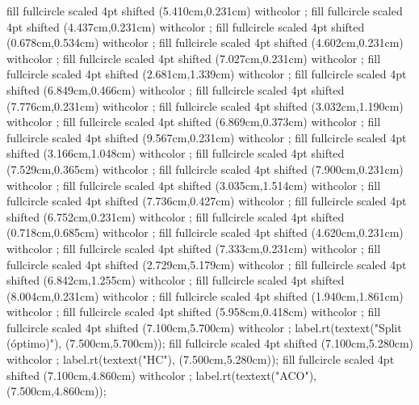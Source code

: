{fill fullcircle scaled 4pt shifted (5.410cm,0.231cm) withcolor ;
fill fullcircle scaled 4pt shifted (4.437cm,0.231cm) withcolor ;
fill fullcircle scaled 4pt shifted (0.678cm,0.534cm) withcolor ;
fill fullcircle scaled 4pt shifted (4.602cm,0.231cm) withcolor ;
fill fullcircle scaled 4pt shifted (7.027cm,0.231cm) withcolor ;
fill fullcircle scaled 4pt shifted (2.681cm,1.339cm) withcolor ;
fill fullcircle scaled 4pt shifted (6.849cm,0.466cm) withcolor ;
fill fullcircle scaled 4pt shifted (7.776cm,0.231cm) withcolor ;
fill fullcircle scaled 4pt shifted (3.032cm,1.190cm) withcolor ;
fill fullcircle scaled 4pt shifted (6.869cm,0.373cm) withcolor ;
fill fullcircle scaled 4pt shifted (9.567cm,0.231cm) withcolor ;
fill fullcircle scaled 4pt shifted (3.166cm,1.048cm) withcolor ;
fill fullcircle scaled 4pt shifted (7.529cm,0.365cm) withcolor ;
fill fullcircle scaled 4pt shifted (7.900cm,0.231cm) withcolor ;
fill fullcircle scaled 4pt shifted (3.035cm,1.514cm) withcolor ;
fill fullcircle scaled 4pt shifted (7.736cm,0.427cm) withcolor ;
fill fullcircle scaled 4pt shifted (6.752cm,0.231cm) withcolor ;
fill fullcircle scaled 4pt shifted (0.718cm,0.685cm) withcolor ;
fill fullcircle scaled 4pt shifted (4.620cm,0.231cm) withcolor ;
fill fullcircle scaled 4pt shifted (7.333cm,0.231cm) withcolor ;
fill fullcircle scaled 4pt shifted (2.729cm,5.179cm) withcolor ;
fill fullcircle scaled 4pt shifted (6.842cm,1.255cm) withcolor ;
fill fullcircle scaled 4pt shifted (8.004cm,0.231cm) withcolor ;
fill fullcircle scaled 4pt shifted (1.940cm,1.861cm) withcolor ;
fill fullcircle scaled 4pt shifted (5.958cm,0.418cm) withcolor ;
fill fullcircle scaled 4pt shifted (7.100cm,5.700cm) withcolor ;
label.rt(textext("\tfx Split (óptimo)"), (7.500cm,5.700cm));
fill fullcircle scaled 4pt shifted (7.100cm,5.280cm) withcolor ;
label.rt(textext("\tfx HC"), (7.500cm,5.280cm));
fill fullcircle scaled 4pt shifted (7.100cm,4.860cm) withcolor ;
label.rt(textext("\tfx ACO"), (7.500cm,4.860cm));
\stopMPcode}

\stopsubsection

\startsubsection[title={Escenarios sin referencia}, reference=sec:res_sin_referencia]


